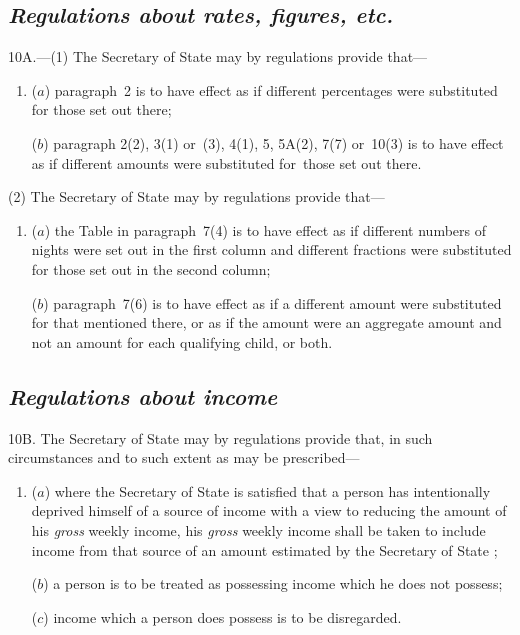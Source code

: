 \documentclass[12pt,a4paper]{article}
\begin{document}
\subsection*{\itshape Regulations about rates, figures, etc.}

10A.---(1) The Secretary of State may by regulations provide that—
\begin{enumerate}\item[]
($a$) paragraph~2 is to have effect as if different percentages were substituted for those set out there;

($b$) paragraph
2(2),  %
3(1)  or~(3), 4(1), 5, 
5A(2),  %
7(7)  or~10(3)  is to have effect as if different amounts were substituted for~those set out there.
\end{enumerate}

(2) The Secretary of State may by regulations provide that—
\begin{enumerate}\item[]
($a$) the Table in paragraph~7(4)  is to have effect as if different numbers of nights were set out in the first column and different fractions were substituted for those set out in the second column;

($b$) paragraph~7(6)  is to have effect as if a different amount were substituted for that mentioned there, or as if the amount were an aggregate amount and not an amount for each qualifying child, or both.
\end{enumerate}


\subsection*{\itshape Regulations about income}

10B. The Secretary of State may by regulations provide that, in such circumstances and to such extent as may be prescribed—
\begin{enumerate}\item[]
($a$) where the 
Secretary of State  %
is satisfied that a person has intentionally deprived himself of a source of income with a view to reducing the amount of his 
\emph{gross}  %
weekly income, his 
\emph{gross}  %
weekly income shall be taken to include income from that source of an amount estimated by the 
Secretary of State%
;

($b$) a person is to be treated as possessing income which he does not possess;

($c$) income which a person does possess is to be disregarded.
\end{enumerate}
\end{document}
